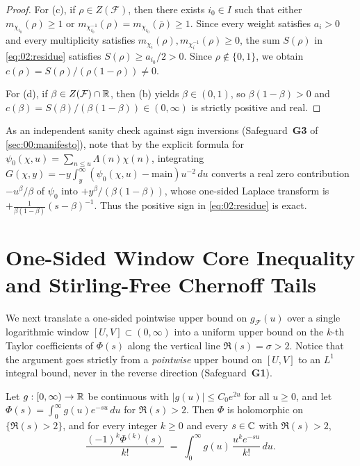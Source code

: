 \begin{proof}
For (c), if $\rho \in Z(\mathcal{F})$, then there exists $i_0 \in I$ such that either $m_{\chi_{i_0}}(\rho) \ge 1$ or $m_{\chi_{i_0}^{-1}}(\rho) = m_{\chi_{i_0}}(\bar{\rho}) \ge 1$. Since every weight satisfies $a_i > 0$ and every multiplicity satisfies $m_{\chi_i}(\rho), m_{\chi_i^{-1}}(\rho) \ge 0$, the sum $S(\rho)$ in \eqref{eq:02:residue} satisfies $S(\rho) \ge a_{i_0}/2 > 0$. Since $\rho \notin \{0, 1\}$, we obtain $c(\rho) = S(\rho)/(\rho(1-\rho)) \neq 0$.

For (d), if $\beta \in Z(\mathcal{F}) \cap \mathbb{R}$, then (b) yields $\beta \in (0, 1)$, so $\beta(1 - \beta) > 0$ and $c(\beta) = S(\beta)/(\beta(1-\beta)) \in (0, \infty)$ is strictly positive and real.
\end{proof}

\begin{remark}
As an independent sanity check against sign inversions (Safeguard~\textbf{G3} of \cref{sec:00:manifesto}), note that by the explicit formula for $\psi_0(\chi, u) = \sum_{n \le u}\Lambda(n)\chi(n)$, integrating $G(\chi, y) = -y\int_y^\infty (\psi_0(\chi, u) - \text{main}) u^{-2}\,du$ converts a real zero contribution $-u^\beta/\beta$ of $\psi_0$ into $+y^\beta / (\beta(1-\beta))$, whose one-sided Laplace transform is $+\frac{1}{\beta(1-\beta)}(s-\beta)^{-1}$. Thus the positive sign in \eqref{eq:02:residue} is exact.
\end{remark}

\section{One-Sided Window Core Inequality and Stirling-Free Chernoff Tails}
\label{sec:02:chernoff}

We next translate a one-sided pointwise upper bound on $g_{\mathcal{F}}(u)$ over a single logarithmic window $[U, V] \subset (0, \infty)$ into a uniform upper bound on the $k$-th Taylor coefficients of $\Phi(s)$ along the vertical line $\Re(s) = \sigma > 2$. Notice that the argument goes strictly from a \emph{pointwise} upper bound on $[U, V]$ to an $L^1$ integral bound, never in the reverse direction (Safeguard~\textbf{G1}).

\begin{lemma}
\label{lem:02:iterated-laplace}
Let $g : [0, \infty) \to \mathbb{R}$ be continuous with $|g(u)| \le C_0 e^{2u}$ for all $u \ge 0$, and let $\Phi(s) = \int_0^\infty g(u) e^{-su}\,du$ for $\Re(s) > 2$. Then $\Phi$ is holomorphic on $\{\Re(s) > 2\}$, and for every integer $k \ge 0$ and every $s \in \mathbb{C}$ with $\Re(s) > 2$,
\begin{equation}
\label{eq:02:iter-lap}
  \frac{(-1)^k \Phi^{(k)}(s)}{k!} \;=\; \int_0^\infty g(u)\,\frac{u^k e^{-su}}{k!}\,du.
\end{equation}
\end{lemma}

